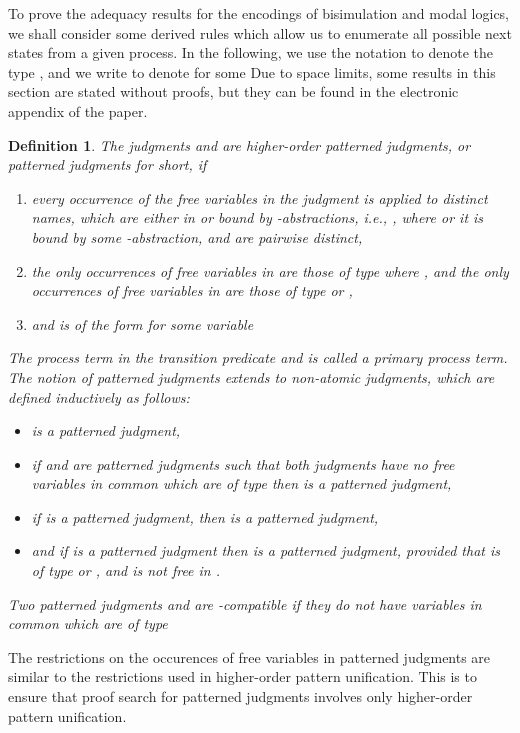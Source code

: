 \documentclass{acmtrans2m}
\newenvironment{definition}{\begin{define} \rm}{\end{define}}
\newtheorem{define}[theorem]{Definition}
\newcommand{\ie}{{\em i.e.}}
\begin{document}
To prove the adequacy results for the encodings of bisimulation and 
modal logics, we shall consider 
some derived rules which allow us to enumerate all possible next states
from a given process. 
In the following, we use the notation  to denote the type
, and we write 
to denote  for some  Due to space limits, some results
in this section are stated without proofs, but they can be found
in the electronic appendix of the paper.


\begin{definition}
The judgments  and
 are 
{\em higher-order patterned judgments}, or patterned judgments for short, if
\begin{enumerate}
\item every occurrence of the free variables in the judgment is applied
to distinct names, which are either in  or bound by -abstractions, \ie,
, where  or it is bound by some
-abstraction, and  are pairwise distinct,
\item the only occurrences of free variables in  are those of type
 where , and the only occurrences of 
free variables in  are those of type 
 or ,
\item and  is of the form  for some variable  
\end{enumerate}
The process term  in the transition predicate  and 
 is called a {\em primary} process term. 
The notion of patterned judgments extends to non-atomic judgments,
which are defined inductively as follows: 
\begin{itemize}
\item  is a patterned judgment,
\item if  and  are patterned judgments
such that both judgments have no free variables in common which are
of type   then  is a patterned judgment, 
\item if  is a patterned judgment, then 
 is a patterned judgment, 
\item and if  is a patterned judgment
then  is a patterned judgment, provided that 
 is of type  or , and
 is not free in . 
\end{itemize}
Two patterned judgments  and  are {\em -compatible}
if they do not have variables in common which are of type 
\end{definition}
The restrictions on the occurences of free variables in 
patterned judgments are similar to the restrictions used in higher-order
pattern unification. This is to ensure that proof search for patterned judgments 
involves only higher-order pattern unification. 
\end{document}
